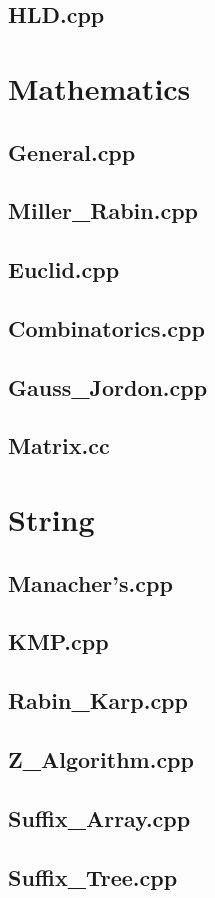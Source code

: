 \subsection{HLD.cpp}

\section{Mathematics}
\subsection{General.cpp}

\subsection{Miller\_Rabin.cpp}

\subsection{Euclid.cpp}

\subsection{Combinatorics.cpp}

\subsection{Gauss\_Jordon.cpp}

\subsection{Matrix.cc}

\section{String}
\subsection{Manacher's.cpp}

\subsection{KMP.cpp}

\subsection{Rabin\_Karp.cpp}

\subsection{Z\_Algorithm.cpp}

\subsection{Suffix\_Array.cpp}

\subsection{Suffix\_Tree.cpp}

